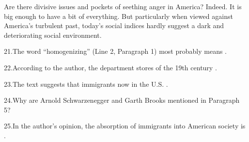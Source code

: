 \qquad Are there divisive issues and pockets of seething anger in America? Indeed. It is big enough to have a bit of everything. But particularly when viewed against America’s turbulent past, today’s social indices hardly suggest a dark and deteriorating social environment.

21.The word “homogenizing” (Line 2, Paragraph 1) most probably means .\par

22.According to the author, the department stores of the 19th century .\par

23.The text suggests that immigrants now in the U.S. .\par

24.Why are Arnold Schwarzenegger and Garth Brooks mentioned in Paragraph 5?\par

25.In the author’s opinion, the absorption of immigrants into American society is .\par
